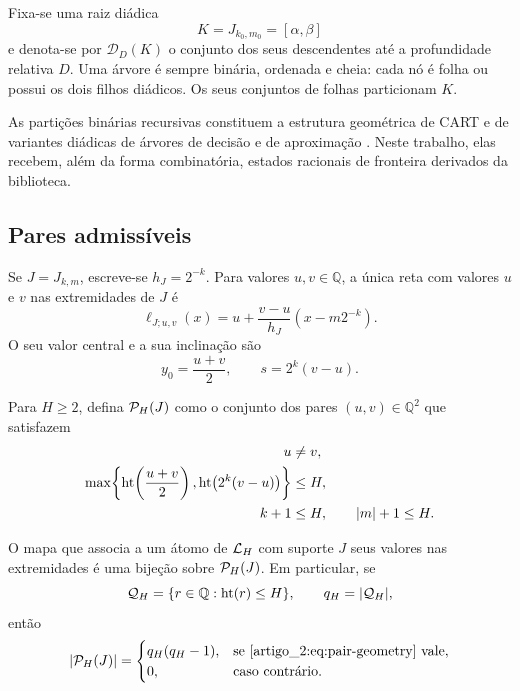 Fixa-se uma raiz diádica
\[
 K=J_{k_0,m_0}=[\alpha,\beta]
\]
e denota-se por $\mathcal D_D(K)$ o conjunto dos seus descendentes até a
profundidade relativa $D$. Uma árvore é sempre binária, ordenada e cheia:
cada nó é folha ou possui os dois filhos diádicos. Os seus conjuntos de folhas
particionam $K$.

As partições binárias recursivas constituem a estrutura geométrica de CART e de variantes
diádicas de árvores de decisão e de aproximação
\citep{artigo_2-breiman1984,artigo_2-donoho1997,artigo_2-blanchard2007}. Neste trabalho, elas recebem, além da forma
combinatória, estados racionais de fronteira derivados da biblioteca.

\subsection{Pares admissíveis}

Se $J=J_{k,m}$, escreve-se $h_J=2^{-k}$. Para valores $u,v\in\mathbb Q$, a única
reta com valores $u$ e $v$ nas extremidades de $J$ é
\begin{equation}
 \ell_{J;u,v}(x)
 =u+\frac{v-u}{h_J}(x-m2^{-k}).
 \label{artigo_2:eq:endpoint-line}
\end{equation}
O seu valor central e a sua inclinação são
\[
 y_0=\frac{u+v}{2},
 \qquad s=2^k(v-u).
\]

\begin{definition}\label{map:artigo_2:4.1}
\label{artigo_2:def:admissible-pairs}
Para $H\ge2$, defina $\mathcal{P}_H(J)$ como o conjunto dos pares
$(u,v)\in\mathbb Q^2$ que satisfazem
\begin{align}
 u&\ne v,\label{artigo_2:eq:pair-nonzero}\\
 \max\!\left\{\operatorname{ht}\!\left(\frac{u+v}{2}\right),
 \operatorname{ht}\!\left(2^k(v-u)\right)\right\}&\le H,\label{artigo_2:eq:pair-arithmetic}\\
 k+1&\le H,\qquad |m|+1\le H.\label{artigo_2:eq:pair-geometry}
\end{align}
\end{definition}

\begin{proposition}\label{map:artigo_2:4.2}
\label{artigo_2:prop:endpoint-dictionary}
O mapa que associa a um átomo de $\mathcal{L}_H$ com suporte $J$ seus valores
nas extremidades é uma bijeção sobre $\mathcal{P}_H(J)$. Em particular, se
\[
 \mathcal Q_H=\{r\in\mathbb Q:\operatorname{ht}(r)\le H\},
 \qquad q_H=|\mathcal Q_H|,
\]
então
\begin{equation}
 |\mathcal{P}_H(J)|=
 \begin{cases}
 q_H(q_H-1),&\text{se \eqref{artigo_2:eq:pair-geometry} vale},\\
 0,&\text{caso contrário}.
 \end{cases}
 \label{artigo_2:eq:pair-count}
\end{equation}
\end{proposition}

